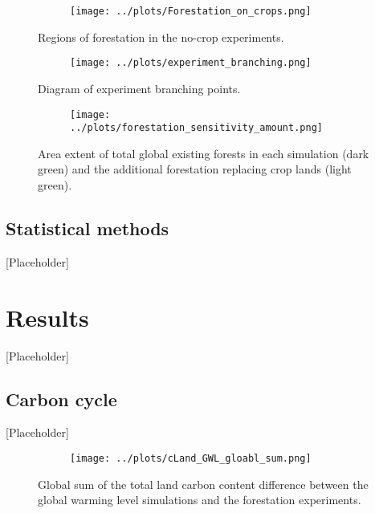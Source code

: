 \documentclass[]{article}
\begin{document}
\begin{figure}[H]
    \centering
    \begin{subfigure}[b]{\linewidth}
        \texttt{[image: ../plots/Forestation\_on\_crops.png]}
    \end{subfigure}
    \caption{Regions of forestation in the no-crop experiments.}
    \label{fig:forestation_on_crops}
\end{figure}

\begin{figure}[H]
    \centering
    \begin{subfigure}[b]{\linewidth}
        \texttt{[image: ../plots/experiment\_branching.png]}
    \end{subfigure}
    \caption{Diagram of experiment branching points.}
    \label{fig:experiment_branching}
\end{figure}

\begin{figure}[H]
    \centering
    \begin{subfigure}[b]{\linewidth}
        \texttt{[image: ../plots/forestation\_sensitivity\_amount.png]}
    \end{subfigure}
    \caption{Area extent of total global existing forests in each simulation (dark green) and the additional forestation replacing crop lands (light green).}
    \label{fig:forestation_ammount}
\end{figure}

\subsection{Statistical methods}

[Placeholder]

\section{Results}

[Placeholder]

\subsection{Carbon cycle}

[Placeholder]

\begin{figure}[H]
    \centering
    \begin{subfigure}[b]{\linewidth}
        \texttt{[image: ../plots/cLand\_GWL\_gloabl\_sum.png]}
    \end{subfigure}
    \caption{Global sum of the total land carbon content difference between the global warming level simulations and the forestation experiments.}
    \label{fig:global_cLand}
\end{figure}
\end{document}
